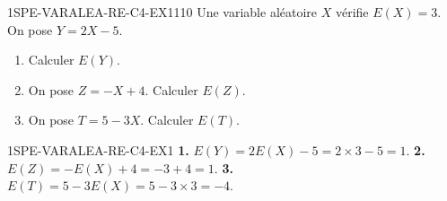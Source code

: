 
\begin{exercice}{1SPE-VARALEA-RE-C4-EX1}{1}{10}
Une variable aléatoire $X$ vérifie $E(X)=3$. On pose $Y=2X-5$.
\begin{enumerate}
  \item Calculer $E(Y)$.
  \item On pose $Z=-X+4$. Calculer $E(Z)$.
  \item On pose $T=5-3X$. Calculer $E(T)$.
\end{enumerate}
\end{exercice}


\begin{corrige}{1SPE-VARALEA-RE-C4-EX1}
\textbf{1.} $E(Y)=2E(X)-5=2\times3-5=1$.
\textbf{2.} $E(Z)=-E(X)+4=-3+4=1$.
\textbf{3.} $E(T)=5-3E(X)=5-3\times3=-4$.
\end{corrige}
